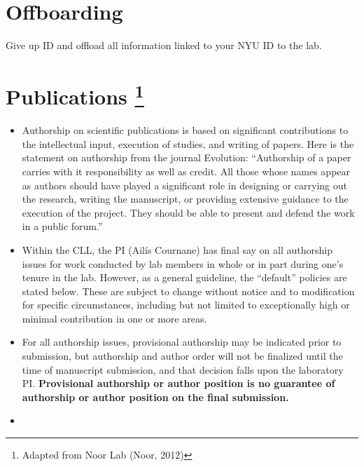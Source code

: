 \documentclass[
]{book}
\begin{document}
\hypertarget{offboarding}{%
\chapter{Offboarding}\label{offboarding}}

Give up ID and offload all information linked to your NYU ID to the lab.

\hypertarget{publications}{%
\chapter[Publications ]{\texorpdfstring{Publications \footnote{Adapted from Noor Lab (Noor, 2012)}}{Publications }}\label{publications}}

\begin{itemize}
\item
  Authorship on scientific publications is based on significant contributions to the intellectual input, execution of studies, and writing of papers. Here is the statement on authorship from the journal Evolution: ``Authorship of a paper carries with it responsibility as well as credit. All those whose names appear as authors should have played a significant role in designing or carrying out the research, writing the manuscript, or providing extensive guidance to the execution of the project. They should be able to present and defend the work in a public forum.''
\item
  Within the CLL, the PI (Ailís Cournane) has final say on all authorship issues for work conducted by lab members in whole or in part during one's tenure in the lab. However, as a general guideline, the ``default'' policies are stated below. These are subject to change without notice and to modification for specific circumstances, including but not limited to exceptionally high or minimal contribution in one or more areas.
\item
  For all authorship issues, provisional authorship may be indicated prior to submission, but authorship and author order will not be finalized until the time of manuscript submission, and that decision falls upon the laboratory PI. \textbf{Provisional authorship or author position is no guarantee of authorship or author position on the final submission.}
\item

\end{itemize}
\end{document}
